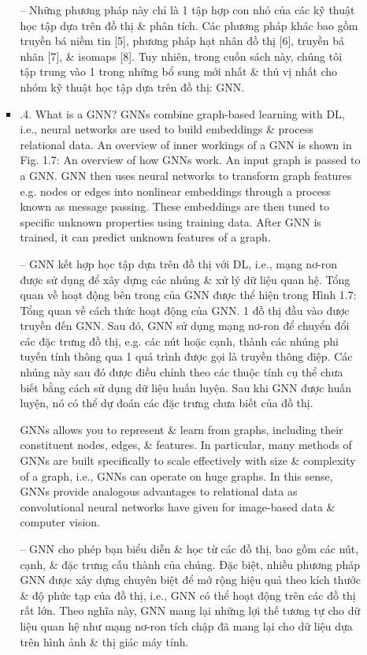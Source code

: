 \documentclass{article}
\begin{document}
\begin{itemize}
\begin{itemize}
\begin{itemize}
            -- Những phương pháp này chỉ là 1 tập hợp con nhỏ của các kỹ thuật học tập dựa trên đồ thị \& phân tích. Các phương pháp khác bao gồm truyền bá niềm tin [5], phương pháp hạt nhân đồ thị [6], truyền bá nhãn [7], \& isomaps [8]. Tuy nhiên, trong cuốn sách này, chúng tôi tập trung vào 1 trong những bổ sung mới nhất \& thú vị nhất cho nhóm kỹ thuật học tập dựa trên đồ thị: GNN.
            \item {.4. What is a GNN?} GNNs combine graph-based learning with DL, i.e., neural networks are used to build embeddings \& process relational data. An overview of inner workings of a GNN is shown in {\sf Fig. 1.7: An overview of how GNNs work. An input graph is passed to a GNN. GNN then uses neural networks to transform graph features e.g. nodes or edges into nonlinear embeddings through a process known as message passing. These embeddings are then tuned to specific unknown properties using training data. After GNN is trained, it can predict unknown features of a graph.}

            -- GNN kết hợp học tập dựa trên đồ thị với DL, i.e., mạng nơ-ron được sử dụng để xây dựng các nhúng \& xử lý dữ liệu quan hệ. Tổng quan về hoạt động bên trong của GNN được thể hiện trong {\sf Hình 1.7: Tổng quan về cách thức hoạt động của GNN. 1 đồ thị đầu vào được truyền đến GNN. Sau đó, GNN sử dụng mạng nơ-ron để chuyển đổi các đặc trưng đồ thị, e.g. các nút hoặc cạnh, thành các nhúng phi tuyến tính thông qua 1 quá trình được gọi là truyền thông điệp. Các nhúng này sau đó được điều chỉnh theo các thuộc tính cụ thể chưa biết bằng cách sử dụng dữ liệu huấn luyện. Sau khi GNN được huấn luyện, nó có thể dự đoán các đặc trưng chưa biết của đồ thị.}

            GNNs allows you to represent \& learn from graphs, including their constituent nodes, edges, \& features. In particular, many methods of GNNs are built specifically to scale effectively with size \& complexity of a graph, i.e., GNNs can operate on huge graphs. In this sense, GNNs provide analogous advantages to relational data as convolutional neural networks have given for image-based data \& computer vision.

            -- GNN cho phép bạn biểu diễn \& học từ các đồ thị, bao gồm các nút, cạnh, \& đặc trưng cấu thành của chúng. Đặc biệt, nhiều phương pháp GNN được xây dựng chuyên biệt để mở rộng hiệu quả theo kích thước \& độ phức tạp của đồ thị, i.e., GNN có thể hoạt động trên các đồ thị rất lớn. Theo nghĩa này, GNN mang lại những lợi thế tương tự cho dữ liệu quan hệ như mạng nơ-ron tích chập đã mang lại cho dữ liệu dựa trên hình ảnh \& thị giác máy tính.


\end{itemize}
\end{itemize}
\end{itemize}
\end{document}
